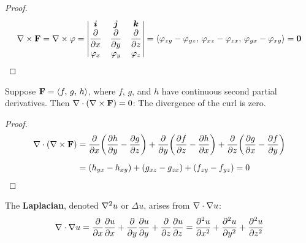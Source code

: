 \documentclass[mathNotesPreamble]{subfiles}
\begin{document}
  \begin{proof}
    \[\nabla\times\mathbf F=\nabla\times\varphi=
      \begin{vmatrix}
        {\bm{i}}& {\bm{j}}& {\bm{k}}\\
        \dfrac{\partial}{\partial x}& \dfrac{\partial}{\partial y}& \dfrac{\partial}{\partial z}\\
        \varphi_x& \varphi_y& \varphi_z
      \end{vmatrix}
      ={\left\langle 
        \varphi_{zy}-\varphi_{yz},\,
        \varphi_{xz}-\varphi_{zx},\,
        \varphi_{yx}-\varphi_{xy} \right\rangle}
      =\mathbf{0}
    \]
  \end{proof}

  \begin{thmBox*}
    Suppose $\mathbf F={\left\langle f,\,g,\,h \right\rangle}$, where $f$, $g$, and $h$ have continuous second partial derivatives. Then $\nabla\cdot{\left(\nabla\times\mathbf F\right)}=0$: The divergence of the curl is zero.
  \end{thmBox*}
  \begin{proof}
    \begin{align*}
      \nabla\cdot{\left(\nabla\times\mathbf F\right)}&=
        \frac{\partial}{\partial x}{\left(\frac{\partial h}{\partial y}-\frac{\partial g}{\partial z}\right)}+
        \frac{\partial}{\partial y}{\left(\frac{\partial f}{\partial z}-\frac{\partial h}{\partial x}\right)}+
        \frac{\partial}{\partial z}{\left(\frac{\partial g}{\partial x}-\frac{\partial f}{\partial y}\right)}\\[5pt]
        &={\left(h_{yx}-h_{xy}\right)}+{\left(g_{xz}-g_{zx}\right)}+{\left(f_{zy}-f_{yz}\right)}=0
    \end{align*}
  \end{proof}
  \pagebreak

  The \textbf{Laplacian}, denoted $\nabla^2 u$ or $\Delta u$, arises from $\nabla\cdot\nabla u$:
    \[\nabla\cdot\nabla u=\frac{\partial }{\partial x}\frac{\partial u}{\partial x}+\frac{\partial }{\partial y}\frac{\partial u}{\partial y}+\frac{\partial }{\partial z}\frac{\partial u}{\partial z}=\frac{\partial^2 u}{\partial x^2}+\frac{\partial^2 u}{\partial y^2}+\frac{\partial^2 u}{\partial z^2}\]
\end{document}
